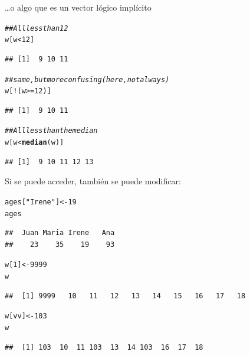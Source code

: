 \documentclass{config/apuntes}\usepackage[]{graphicx}\usepackage[]{xcolor}
\makeatletter
\newcommand{\hlnum}[1]{\textcolor[rgb]{0.686,0.059,0.569}{#1}}%
\newcommand{\hlsng}[1]{\textcolor[rgb]{0.192,0.494,0.8}{#1}}%
\newcommand{\hlcom}[1]{\textcolor[rgb]{0.678,0.584,0.686}{\textit{#1}}}%
\newcommand{\hlopt}[1]{\textcolor[rgb]{0,0,0}{#1}}%
\newcommand{\hldef}[1]{\textcolor[rgb]{0.345,0.345,0.345}{#1}}%
\newcommand{\hlkwb}[1]{\textcolor[rgb]{0.69,0.353,0.396}{#1}}%
\newcommand{\hlkwd}[1]{\textcolor[rgb]{0.737,0.353,0.396}{\textbf{#1}}}%
\newenvironment{kframe}{%
 \def\at@end@of@kframe{}%
 \ifinner\ifhmode%
  \def\at@end@of@kframe{\end{minipage}}%
  \begin{minipage}{\columnwidth}%
 \fi\fi%
 \def\FrameCommand##1{\hskip\@totalleftmargin \hskip-\fboxsep
 \colorbox{shadecolor}{##1}\hskip-\fboxsep
     \hskip-\linewidth \hskip-\@totalleftmargin \hskip\columnwidth}%
 \MakeFramed {\advance\hsize-\width
   \@totalleftmargin\z@ \linewidth\hsize
   \@setminipage}}%
 {\par\unskip\endMakeFramed%
 \at@end@of@kframe}
\newenvironment{knitrout}{}{} %
\makeatother
\begin{document}
\ldots o algo que es un vector lógico implícito 
\begin{knitrout}
\color{fgcolor}\begin{kframe}
\begin{alltt}
\hlcom{## All less than 12}
\hldef{w[w} \hlopt{<} \hlnum{12}\hldef{]}
\end{alltt}
\begin{verbatim}
## [1]  9 10 11
\end{verbatim}
\begin{alltt}
\hlcom{## same, but more confusing (here, not always)}
\hldef{w[}\hlopt{!}\hldef{(w} \hlopt{>=} \hlnum{12}\hldef{)]}
\end{alltt}
\begin{verbatim}
## [1]  9 10 11
\end{verbatim}
\begin{alltt}
\hlcom{## All less than the median}
\hldef{w[w} \hlopt{<} \hlkwd{median}\hldef{(w)]}
\end{alltt}
\begin{verbatim}
## [1]  9 10 11 12 13
\end{verbatim}
\end{kframe}
\end{knitrout}


Si se puede acceder, también se puede modificar: 
\begin{knitrout}
\color{fgcolor}\begin{kframe}
\begin{alltt}
\hldef{ages[}\hlsng{"Irene"}\hldef{]} \hlkwb{<-} \hlnum{19}
\hldef{ages}
\end{alltt}
\begin{verbatim}
##  Juan Maria Irene   Ana 
##    23    35    19    93
\end{verbatim}
\begin{alltt}
\hldef{w[}\hlnum{1}\hldef{]} \hlkwb{<-} \hlnum{9999}
\hldef{w}
\end{alltt}
\begin{verbatim}
##  [1] 9999   10   11   12   13   14   15   16   17   18
\end{verbatim}
\begin{alltt}
\hldef{w[vv]} \hlkwb{<-} \hlnum{103}
\hldef{w}
\end{alltt}
\begin{verbatim}
##  [1] 103  10  11 103  13  14 103  16  17  18
\end{verbatim}
\end{kframe}
\end{knitrout}
\end{document}
